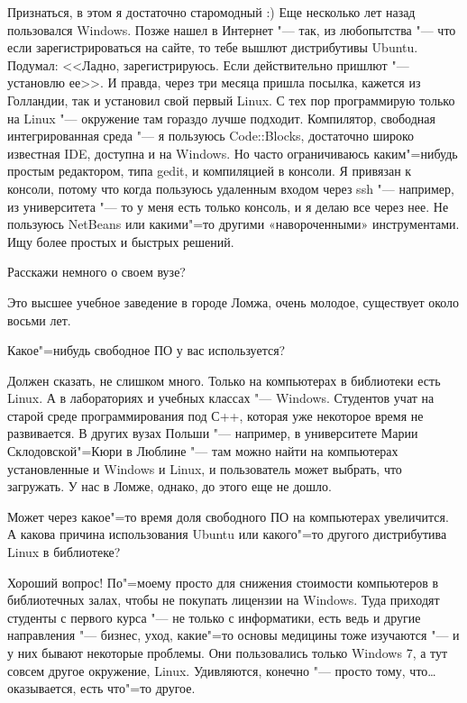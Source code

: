 \documentclass[10pt, a5paper]{article}
\begin{document}
\a Признаться, в этом я достаточно старомодный :) Еще несколько лет назад пользовался Windows. Позже нашел в Интернет "--- так, из любопытства "--- что если зарегистрироваться на сайте, то тебе вышлют дистрибутивы Ubuntu. Подумал: <<Ладно, зарегистрируюсь. Если действительно пришлют "--- установлю ее>>. И правда, через три месяца пришла посылка, кажется из Голландии, так и установил свой первый Linux. С тех пор программирую только на Linux "--- окружение там гораздо лучше подходит. Компилятор, свободная интегрированная среда "--- я пользуюсь Code::Blocks, достаточно широко известная IDE, доступна и на Windows. Но часто ограничиваюсь каким"=нибудь простым редактором, типа gedit, и компиляцией в консоли. Я привязан к консоли, потому что когда пользуюсь удаленным входом через ssh "--- например, из университета "--- то у меня есть только консоль, и я делаю все через нее. Не пользуюсь NetBeans или какими"=то другими «навороченными» инструментами. Ищу более простых и быстрых решений.

\q Расскажи немного о своем вузе?

\noindent Это высшее учебное заведение в городе Ломжа, очень молодое, существует около восьми лет. 

\q Какое"=нибудь свободное ПО у вас используется?

\a Должен сказать, не слишком много. Только на компьютерах в библиотеки есть Linux. А в лабораториях и учебных классах "--- Windows. Студентов учат на старой среде программирования под С++, которая уже некоторое время не развивается. В других вузах Польши "--- например, в университете Марии Склодовской"=Кюри в Люблине "--- там можно найти на компьютерах установленные и Windows и Linux, и пользователь может выбрать, что загружать. У нас в Ломже, однако, до этого еще не дошло.

\q Может через какое"=то время доля свободного ПО на компьютерах увеличится. А какова причина использования Ubuntu или какого"=то другого дистрибутива Linux в библиотеке?

\a Хороший вопрос! По"=моему просто для снижения стоимости компьютеров в библиотечных залах, чтобы не покупать лицензии на Windows. Туда приходят студенты с первого курса "--- не только с информатики, есть ведь и другие направления "--- бизнес, уход, какие"=то основы медицины тоже изучаются "--- и у них бывают некоторые проблемы. Они пользовались только Windows 7, а тут совсем другое окружение, Linux. Удивляются, конечно "--- просто тому, что\ldots оказывается, есть что"=то другое. 
\end{document}
